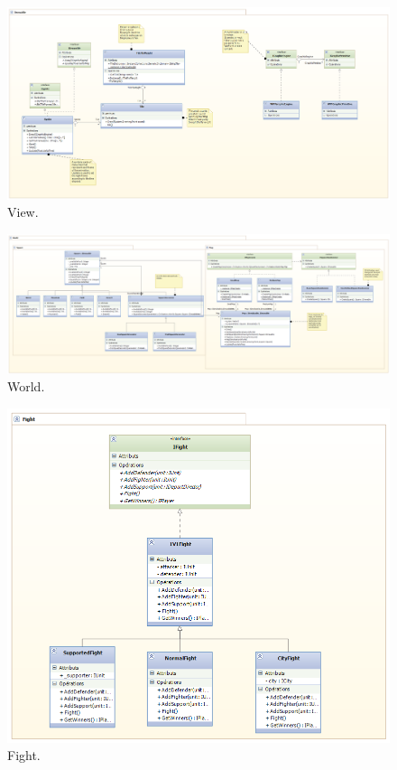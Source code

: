 \begin{figure}
    \begin{center}  
    \includegraphics[width=\textwidth]{view.png}
    \caption{View.}
    \label{view}
\end{center}
\end{figure}

\begin{figure}
    \begin{center}  
    \includegraphics[width=\textwidth]{world.png}
    \caption{World.}
    \label{world}
\end{center}
\end{figure}

\begin{figure}
    \begin{center}  
    \includegraphics[width=\textwidth]{fight.png}
    \caption{Fight.}
    \label{fight}
\end{center}
\end{figure}

